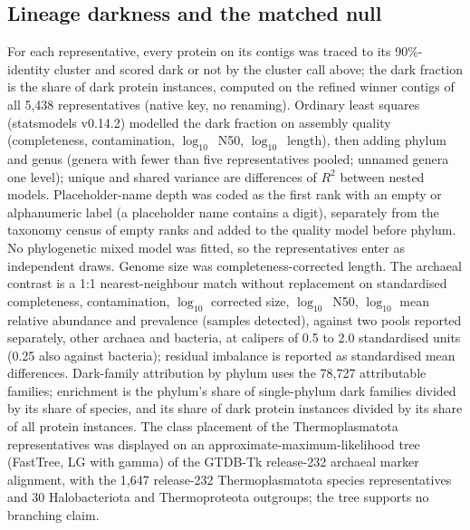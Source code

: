 \documentclass[11pt]{article}
\begin{document}
\subsection*{Lineage darkness and the matched null}
For each representative, every protein on its contigs was traced to its 90\%-identity cluster and
scored dark or not by the cluster call above; the dark fraction is the share of dark protein
instances, computed on the refined winner contigs of all 5{,}438 representatives (native key, no
renaming). Ordinary least squares (statsmodels v0.14.2) modelled the dark fraction on assembly quality
(completeness, contamination, $\log_{10}$~N50, $\log_{10}$~length), then adding phylum and genus
(genera with fewer than five representatives pooled; unnamed genera one level); unique and shared
variance are differences of $R^2$ between nested models. Placeholder-name depth was coded as the first rank with an empty or alphanumeric label
(a placeholder name contains a digit), separately from the taxonomy census of empty ranks and added to the quality model before phylum. No
phylogenetic mixed model was fitted, so the representatives enter as independent draws. Genome size
was completeness-corrected length. The archaeal contrast is a 1:1 nearest-neighbour match without
replacement on standardised completeness, contamination, $\log_{10}$ corrected size,
$\log_{10}$~N50, $\log_{10}$ mean relative abundance and prevalence (samples detected), against two
pools reported separately, other archaea and bacteria, at calipers of 0.5 to 2.0 standardised units
(0.25 also against bacteria); residual imbalance is reported as standardised mean differences. Dark-family attribution by
phylum uses the 78{,}727 attributable families; enrichment is the phylum's share of single-phylum
dark families divided by its share of species, and its share of dark protein instances divided by
its share of all protein instances. The class placement of the Thermoplasmatota representatives was
displayed on an approximate-maximum-likelihood tree (FastTree, LG with gamma) of the GTDB-Tk
release-232 archaeal marker alignment, with the 1{,}647 release-232 Thermoplasmatota species
representatives and 30 Halobacteriota and Thermoproteota outgroups; the tree supports no branching
claim.
\end{document}
